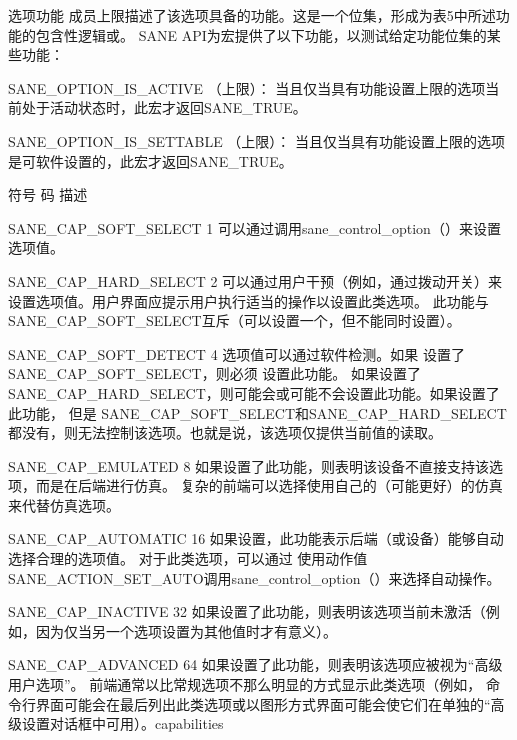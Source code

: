 选项功能 成员上限描述了该选项具备的功能。这是一个位集，形成为表5中所述功能的包含性逻辑或。 S\+A\+NE A\+P\+I为宏提供了以下功能，以测试给定功能位集的某些功能：

S\+A\+N\+E\+\_\+\+O\+P\+T\+I\+O\+N\+\_\+\+I\+S\+\_\+\+A\+C\+T\+I\+VE （上限）： 当且仅当具有功能设置上限的选项当前处于活动状态时，此宏才返回\+S\+A\+N\+E\+\_\+\+T\+R\+U\+E。

S\+A\+N\+E\+\_\+\+O\+P\+T\+I\+O\+N\+\_\+\+I\+S\+\_\+\+S\+E\+T\+T\+A\+B\+LE （上限）： 当且仅当具有功能设置上限的选项是可软件设置的，此宏才返回\+S\+A\+N\+E\+\_\+\+T\+R\+U\+E。 \begin{DoxyVerb}符号             码   描述
\end{DoxyVerb}


S\+A\+N\+E\+\_\+\+C\+A\+P\+\_\+\+S\+O\+F\+T\+\_\+\+S\+E\+L\+E\+CT 1 可以通过调用sane\+\_\+control\+\_\+option（）来设置选项值。

S\+A\+N\+E\+\_\+\+C\+A\+P\+\_\+\+H\+A\+R\+D\+\_\+\+S\+E\+L\+E\+CT 2 可以通过用户干预（例如，通过拨动开关）来设置选项值。用户界面应提示用户执行适当的操作以设置此类选项。 此功能与\+S\+A\+N\+E\+\_\+\+C\+A\+P\+\_\+\+S\+O\+F\+T\+\_\+\+S\+E\+L\+E\+C\+T互斥（可以设置一个，但不能同时设置）。

S\+A\+N\+E\+\_\+\+C\+A\+P\+\_\+\+S\+O\+F\+T\+\_\+\+D\+E\+T\+E\+CT 4 选项值可以通过软件检测。如果 设置了\+S\+A\+N\+E\+\_\+\+C\+A\+P\+\_\+\+S\+O\+F\+T\+\_\+\+S\+E\+L\+E\+C\+T，则必须 设置此功能。 如果设置了\+S\+A\+N\+E\+\_\+\+C\+A\+P\+\_\+\+H\+A\+R\+D\+\_\+\+S\+E\+L\+E\+C\+T，则可能会或可能不会设置此功能。如果设置了此功能， 但是 S\+A\+N\+E\+\_\+\+C\+A\+P\+\_\+\+S\+O\+F\+T\+\_\+\+S\+E\+L\+E\+C\+T和\+S\+A\+N\+E\+\_\+\+C\+A\+P\+\_\+\+H\+A\+R\+D\+\_\+\+S\+E\+L\+E\+CT 都没有，则无法控制该选项。也就是说，该选项仅提供当前值的读取。

S\+A\+N\+E\+\_\+\+C\+A\+P\+\_\+\+E\+M\+U\+L\+A\+T\+ED 8 如果设置了此功能，则表明该设备不直接支持该选项，而是在后端进行仿真。 复杂的前端可以选择使用自己的（可能更好）的仿真来代替仿真选项。

S\+A\+N\+E\+\_\+\+C\+A\+P\+\_\+\+A\+U\+T\+O\+M\+A\+T\+IC 16 如果设置，此功能表示后端（或设备）能够自动选择合理的选项值。 对于此类选项，可以通过 使用动作值\+S\+A\+N\+E\+\_\+\+A\+C\+T\+I\+O\+N\+\_\+\+S\+E\+T\+\_\+\+A\+U\+T\+O调用sane\+\_\+control\+\_\+option（）来选择自动操作。

S\+A\+N\+E\+\_\+\+C\+A\+P\+\_\+\+I\+N\+A\+C\+T\+I\+VE 32 如果设置了此功能，则表明该选项当前未激活（例如，因为仅当另一个选项设置为其他值时才有意义）。

S\+A\+N\+E\+\_\+\+C\+A\+P\+\_\+\+A\+D\+V\+A\+N\+C\+ED 64 如果设置了此功能，则表明该选项应被视为“高级用户选项”。 前端通常以比常规选项不那么明显的方式显示此类选项（例如， 命令行界面可能会在最后列出此类选项或以图形方式界面可能会使它们在单独的``高级设置\textquotesingle{}\textquotesingle{}对话框中可用）。capabilities \mbox{\label{structSANE__Option__Descriptor_a80649aa043f3209173efcb22a6bcd5e5}} 
